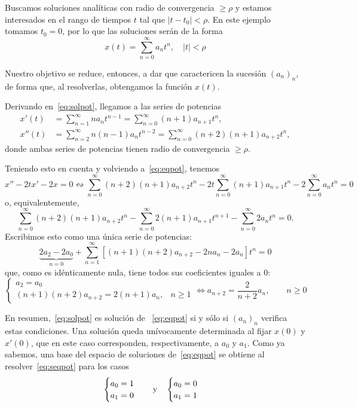 \documentclass[../ecuaciones_diferenciales.tex]{subfiles}
\begin{document}
\begin{solution}
	Buscamos soluciones analíticas con radio de convergencia \(\geq \rho\) y
	estamos interesados en el rango de tiempos \(t\) tal que \(|t-t_0| <
	\rho\). En este ejemplo tomamos \(t_0 = 0\), por lo que las soluciones serán
	de la forma
	\begin{equation}
		\label{eq:solpot}
		x(t) = \sum_{n=0}^\infty a_nt^n, \quad |t| < \rho
	\end{equation}

	Nuestro objetivo se reduce, entonces, a dar  que 
	caractericen la sucesión \((a_n)_n\), de forma que, al resolverlas, 
	obtengamos la función \(x(t)\).

	Derivando en~\eqref{eq:solpot}, llegamos a las series de potencias
	\begin{align*}
		x'(t)  & = \sum_{n=1}^\infty na_nt^{n-1}
		= \sum_{n=0}^\infty (n+1)a_{n+1}t^n,          \\
		x''(t) & = \sum_{n=2}^\infty n(n-1)a_nt^{n-2}
		= \sum_{n=0}^\infty (n+2)(n+1)a_{n+2}t^n,
	\end{align*}
	donde ambas series de potencias tienen radio de convergencia \(\geq \rho\).

	Teniendo esto en cuenta y volviendo a~\eqref{eq:eqpot}, tenemos
	\[x''-2tx'-2x=0 \leftrightsquigarrow \sum_{n=0}^\infty (n+2)(n+1)a_{n+2}t^n -
		2t \sum_{n=0}^\infty (n+1)a_{n+1}t^n - 2 \sum_{n=0}^\infty a_nt^n = 0\]
	o, equivalentemente,
	\[\sum_{n=0}^\infty (n+2)(n+1)a_{n+2}t^n - \sum_{n=0}^\infty
		2(n+1)a_{n+1}t^{n+1} - \sum_{n=0}^\infty 2a_nt^n = 0.\]
	Escribimos esto como una única serie de potencias:
	\[\underbrace{2a_2-2a_0}_{n=0} +
		\sum_{n=1}^\infty[(n+1)(n+2)a_{n+2}-2na_n-2a_n]t^n = 0\]
	que, como es idénticamente nula, tiene todos sus coeficientes iguales a 0:
	\begin{equation}
		\label{eq:seqpot}
		\begin{cases}
			a_2 = a_0                                 \\
			(n+1)(n+2)a_{n+2} = 2(n+1)a_n, & n \geq 1
		\end{cases} \iff
		a_{n+2} = \frac{2}{n+2} a_n, \qquad n \geq 0
	\end{equation}

	En resumen,~\eqref{eq:solpot} es solución de ~\eqref{eq:eqpot} si y sólo si
	\((a_n)_n\) verifica estas condiciones. Una solución queda unívocamente
	determinada al fijar \(x(0)\) y \(x'(0)\), que en este caso corresponden,
	respectivamente, a \(a_0\) y \(a_1\). Como ya sabemos, una base del espacio de
	soluciones de~\eqref{eq:eqpot} se obtiene al resolver~\eqref{eq:seqpot} para los
	casos
	\[\begin{cases}a_0 = 1 \\ a_1 = 0\end{cases}
		\quad \text{y} \quad
		\begin{cases}a_0 = 0 \\ a_1 = 1\end{cases}\]


\end{solution}
\end{document}
